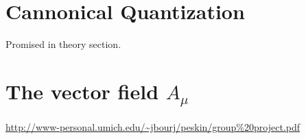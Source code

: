 \section{Cannonical Quantization}\label{sec:canQuant}
Promised in theory section.

\section{The vector field $A_\mu$}\label{sec:appendixVectorField}
\url{http://www-personal.umich.edu/~jbourj/peskin/group%20project.pdf}
